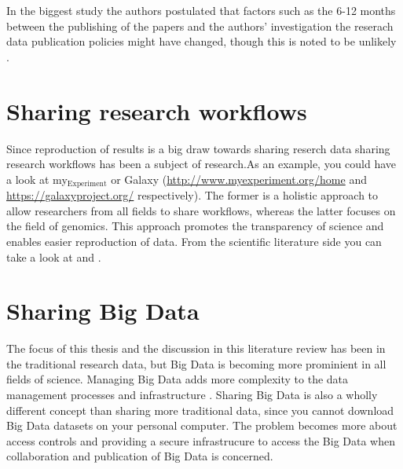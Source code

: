 In the biggest study the authors postulated that factors such as the 6-12
months between the publishing of the papers and the authors' investigation
the reserach data publication policies might have changed, though this is noted
to be unlikely \cite{alsheikh2011public}.


\section{Sharing research workflows}

Since reproduction of results is a big draw towards sharing reserch data
sharing research workflows has been a subject of research.As an example, you
could have a look at my\({}_{\mbox{Experiment}}\) or Galaxy 
(\url{http://www.myexperiment.org/home} and \url{https://galaxyproject.org/}
respectively). The former is a holistic approach to allow researchers from all
fields to share workflows, whereas the latter focuses on the field of genomics.
This approach promotes the transparency of science and enables
easier reproduction of data. From the scientific literature side you can take
a look at \cite{goecks2010galaxy} and \cite{DBLP:journals/fgcs/RoureGS09}.

\section{Sharing Big Data}

The focus of this thesis and the discussion in this literature review has been
in the traditional research data, but Big Data is becoming more prominient in
all fields of science. Managing Big Data adds more complexity to the data
management processes and infrastructure
\cite{DBLP:conf/cloudcom/DemchenkoZGWL12}. Sharing Big Data is also a wholly
different concept than sharing more traditional data, since you cannot download
Big Data datasets on your personal computer. The problem becomes more about
access controls and providing a secure infrastrucure to access the Big Data
when collaboration and publication of Big Data is concerned.

